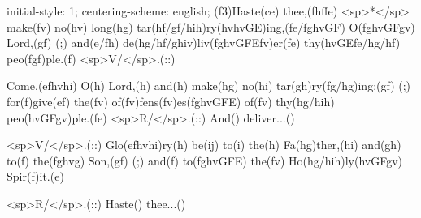 initial-style: 1;
centering-scheme: english;
(f3)Haste(ce) thee,(fhffe) <sp>*</sp> make(fv) no(hv) long(hg) tar(hf/gf/hih)ry(hvhvGE)ing,(fe/fghvGF) O(fghvGFgv) Lord,(gf) (;) and(e/fh) de(hg/hf/ghiv)liv(fghvGFEfv)er(fe) thy(hvGEfe/hg/hf) peo(fgf)ple.(f) <sp>V/</sp>.(::)

Come,(efhvhi) O(h) Lord,(h) and(h) make(hg) no(hi) tar(gh)ry(fg/hg)ing:(gf) (;) for(f)give(ef) the(fv) of(fv)fens(fv)es(fghvGFE) of(fv) thy(hg/hih) peo(hvGFgv)ple.(fe) <sp>R/</sp>.(::) And() deliver...() 

<sp>V/</sp>.(::) Glo(efhvhi)ry(h) be(ij) to(i) the(h) Fa(hg)ther,(hi) and(gh) to(f) the(fghvg) Son,(gf) (;) and(f) to(fghvGFE) the(fv) Ho(hg/hih)ly(hvGFgv) Spir(f)it.(e) 

<sp>R/</sp>.(::) Haste() thee...()
